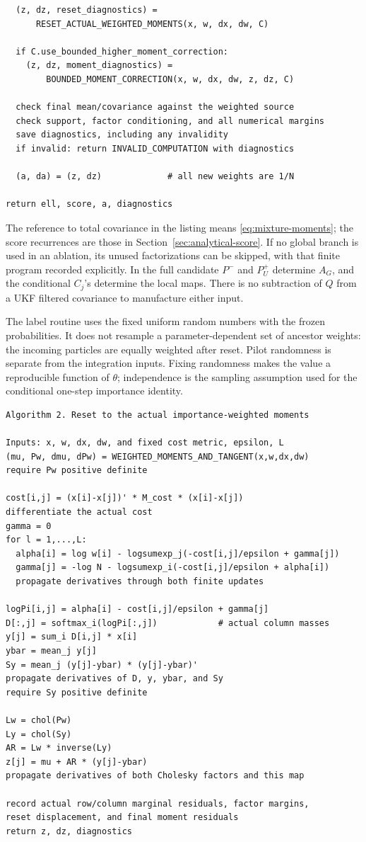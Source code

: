 \documentclass[11pt,a4paper]{article}
\begin{document}
\begin{lstlisting}
  (z, dz, reset_diagnostics) =
      RESET_ACTUAL_WEIGHTED_MOMENTS(x, w, dx, dw, C)

  if C.use_bounded_higher_moment_correction:
    (z, dz, moment_diagnostics) =
        BOUNDED_MOMENT_CORRECTION(x, w, dx, dw, z, dz, C)

  check final mean/covariance against the weighted source
  check support, factor conditioning, and all numerical margins
  save diagnostics, including any invalidity
  if invalid: return INVALID_COMPUTATION with diagnostics

  (a, da) = (z, dz)             # all new weights are 1/N

return ell, score, a, diagnostics
\end{lstlisting}

The reference to total covariance in the listing means
\eqref{eq:mixture-moments}; the score recurrences are those in
Section~\ref{sec:analytical-score}. If no global branch is used in an ablation, its unused
factorizations can be skipped, with that finite program recorded explicitly.
In the full candidate \(P^-\) and \(P_U^+\) determine \(A_G\), and the
conditional \(C_j\)'s determine the local maps. There is no subtraction
of \(Q\) from a UKF filtered covariance to manufacture either input.

The label routine uses the fixed uniform random numbers with the frozen
probabilities. It does not resample a parameter-dependent set of ancestor
weights: the incoming particles are equally weighted after reset.
Pilot randomness is separate from the integration inputs. Fixing randomness
makes the value a reproducible function of \(\theta\); independence is the
sampling assumption used for the conditional one-step importance identity.

\begin{lstlisting}
Algorithm 2. Reset to the actual importance-weighted moments

Inputs: x, w, dx, dw, and fixed cost metric, epsilon, L
(mu, Pw, dmu, dPw) = WEIGHTED_MOMENTS_AND_TANGENT(x,w,dx,dw)
require Pw positive definite

cost[i,j] = (x[i]-x[j])' * M_cost * (x[i]-x[j])
differentiate the actual cost
gamma = 0
for l = 1,...,L:
  alpha[i] = log w[i] - logsumexp_j(-cost[i,j]/epsilon + gamma[j])
  gamma[j] = -log N - logsumexp_i(-cost[i,j]/epsilon + alpha[i])
  propagate derivatives through both finite updates

logPi[i,j] = alpha[i] - cost[i,j]/epsilon + gamma[j]
D[:,j] = softmax_i(logPi[:,j])            # actual column masses
y[j] = sum_i D[i,j] * x[i]
ybar = mean_j y[j]
Sy = mean_j (y[j]-ybar) * (y[j]-ybar)'
propagate derivatives of D, y, ybar, and Sy
require Sy positive definite

Lw = chol(Pw)
Ly = chol(Sy)
AR = Lw * inverse(Ly)
z[j] = mu + AR * (y[j]-ybar)
propagate derivatives of both Cholesky factors and this map

record actual row/column marginal residuals, factor margins,
reset displacement, and final moment residuals
return z, dz, diagnostics
\end{lstlisting}
\end{document}
